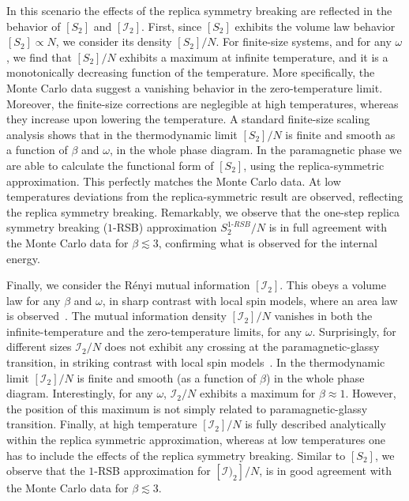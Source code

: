 \documentclass[twocolumn,superscriptaddress,prb,10pt]{revtex4-1}
\begin{document}
In this scenario the effects of the replica symmetry breaking are 
reflected in the behavior of $[S_2]$ and $[{\mathcal I}_2]$. First, since $[S_2]$ exhibits 
the volume law behavior $[S_2]\propto N$, we consider its density $[S_2]/N$. For finite-size 
systems, and for any $\omega$, we find that $[S_2]/N$ exhibits a maximum at infinite 
temperature, and it is a monotonically decreasing function of the temperature. More 
specifically, the Monte Carlo data suggest a vanishing behavior in the zero-temperature 
limit. Moreover, the finite-size corrections are neglegible at high temperatures, 
whereas they increase upon lowering the temperature. A standard finite-size scaling 
analysis shows that in the thermodynamic limit $[S_2]/N$ is finite and smooth as a 
function of $\beta$ and $\omega$, in the whole phase diagram. In the paramagnetic phase 
we are able to calculate the functional form of $[S_2]$, using the replica-symmetric 
approximation. This perfectly matches the Monte Carlo data. At low temperatures deviations 
from the replica-symmetric result are observed, reflecting the replica symmetry breaking. 
Remarkably, we observe that the one-step replica symmetry breaking ($1$-RSB) approximation 
$S_2^{1\textrm{-}RSB}/N$ is in full agreement with the Monte Carlo data for $\beta
\lesssim 3$, confirming what is observed for the internal energy. 

Finally, we consider the R\'enyi mutual information $[{\mathcal I}_2]$. This  
obeys a volume law for any $\beta$ and $\omega$, in sharp contrast with local spin models, 
where an area law is observed~\cite{wolf-2008}. The mutual information density $[{\mathcal I}_2]/N$ 
vanishes in both the infinite-temperature and the zero-temperature limits, for any $\omega$. 
Surprisingly, for different sizes ${\mathcal I}_2/N$ does not exhibit any crossing at the 
paramagnetic-glassy transition, in striking contrast with local spin models~\cite{jaconis-2013}. 
In the thermodynamic limit $[{\mathcal I}_2]/N$ is finite and smooth (as a function of $\beta$) 
in the whole phase diagram. Interestingly, for any $\omega$, ${\mathcal I}_2/N$ exhibits a 
maximum for $\beta\approx 1$. However, the position of this maximum is not simply related to 
paramagnetic-glassy transition. Finally, at high temperature $[{\mathcal I}_2]/N$ is fully 
described analytically within the replica symmetric approximation, whereas at low temperatures 
one has to include  the effects of the replica symmetry breaking. Similar to $[S_2]$, we observe 
that the $1$-RSB approximation for $[{\mathcal I})_2]/N$, is in good agreement with the Monte Carlo 
data for $\beta \lesssim 3$.
\end{document}
